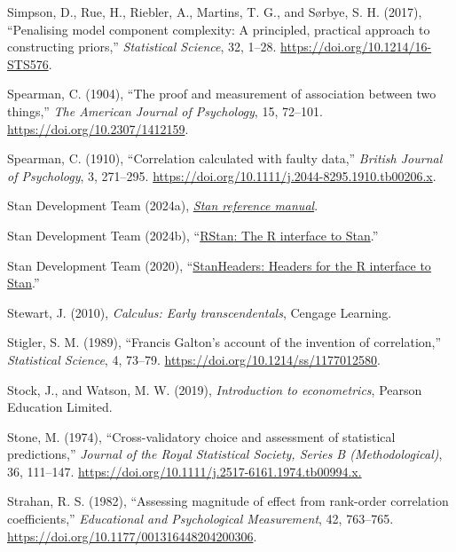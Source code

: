 \documentclass[
  10pt,
  a4paper,
  twoside]{article}
\newlength{\cslhangindent}
\newenvironment{CSLReferences}[2] %
 {\begin{list}{}{%
  \setlength{\itemindent}{0pt}
  \setlength{\leftmargin}{0pt}
  \setlength{\parsep}{0pt}
  \ifodd #1
   \setlength{\leftmargin}{\cslhangindent}
   \setlength{\itemindent}{-1\cslhangindent}
  \fi
  \setlength{\itemsep}{#2\baselineskip}}}
 {\end{list}}
\begin{document}
\begin{CSLReferences}{1}{0}
Simpson, D., Rue, H., Riebler, A., Martins, T. G., and Sørbye, S. H. (2017), {``Penalising model component complexity: A principled, practical approach to constructing priors,''} \emph{Statistical Science}, 32, 1--28. \url{https://doi.org/10.1214/16-STS576}.

Spearman, C. (1904), {``The proof and measurement of association between two things,''} \emph{The American Journal of Psychology}, 15, 72--101. \url{https://doi.org/10.2307/1412159}.

Spearman, C. (1910), {``Correlation calculated with faulty data,''} \emph{British Journal of Psychology}, 3, 271--295. \url{https://doi.org/10.1111/j.2044-8295.1910.tb00206.x}.

Stan Development Team (2024a), \emph{\href{https://mc-stan.org}{Stan reference manual}}.

Stan Development Team (2024b), {``\href{https://mc-stan.org/}{{RStan}: The {R} interface to {Stan}}.''}

Stan Development Team (2020), {``\href{https://mc-stan.org/}{{StanHeaders}: Headers for the {R} interface to {Stan}}.''}

Stewart, J. (2010), \emph{Calculus: Early transcendentals}, Cengage Learning.

Stigler, S. M. (1989), {``{Francis Galton's} account of the invention of correlation,''} \emph{Statistical Science}, 4, 73--79. \url{https://doi.org/10.1214/ss/1177012580}.

Stock, J., and Watson, M. W. (2019), \emph{Introduction to econometrics}, Pearson Education Limited.

Stone, M. (1974), {``Cross-validatory choice and assessment of statistical predictions,''} \emph{Journal of the Royal Statistical Society, Series B (Methodological)}, 36, 111--147. \url{https://doi.org/10.1111/j.2517-6161.1974.tb00994.x.}

Strahan, R. S. (1982), {``Assessing magnitude of effect from rank-order correlation coefficients,''} \emph{Educational and Psychological Measurement}, 42, 763--765. \url{https://doi.org/10.1177/001316448204200306}.


\end{CSLReferences}
\end{document}
